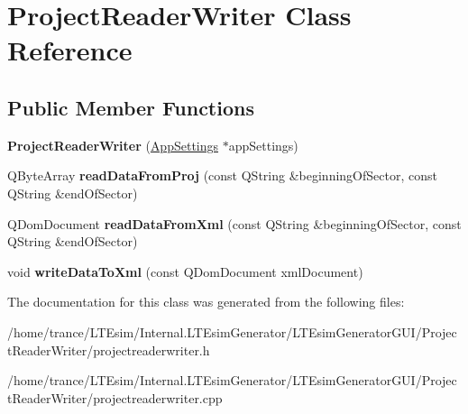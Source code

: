 \hypertarget{class_project_reader_writer}{}\section{Project\+Reader\+Writer Class Reference}
\label{class_project_reader_writer}
\subsection*{Public Member Functions}
\begin{DoxyCompactItemize}
\item 
{\bfseries Project\+Reader\+Writer} (\hyperlink{class_app_settings}{App\+Settings} $\ast$app\+Settings)\hypertarget{class_project_reader_writer_a1d6ed1cbeb33ce0e7b4ebf5c780dbdd0}{}\label{class_project_reader_writer_a1d6ed1cbeb33ce0e7b4ebf5c780dbdd0}

\item 
Q\+Byte\+Array {\bfseries read\+Data\+From\+Proj} (const Q\+String \&beginning\+Of\+Sector, const Q\+String \&end\+Of\+Sector)\hypertarget{class_project_reader_writer_a73636120e388c13d6d90c4c51c8044be}{}\label{class_project_reader_writer_a73636120e388c13d6d90c4c51c8044be}

\item 
Q\+Dom\+Document {\bfseries read\+Data\+From\+Xml} (const Q\+String \&beginning\+Of\+Sector, const Q\+String \&end\+Of\+Sector)\hypertarget{class_project_reader_writer_a5e14c23a3d2dbb36eee88b991e0f5211}{}\label{class_project_reader_writer_a5e14c23a3d2dbb36eee88b991e0f5211}

\item 
void {\bfseries write\+Data\+To\+Xml} (const Q\+Dom\+Document xml\+Document)\hypertarget{class_project_reader_writer_a508a1c86080180fdfde0f8dbe6a77d74}{}\label{class_project_reader_writer_a508a1c86080180fdfde0f8dbe6a77d74}

\end{DoxyCompactItemize}


The documentation for this class was generated from the following files\+:\begin{DoxyCompactItemize}
\item 
/home/trance/\+L\+T\+Esim/\+Internal.\+L\+T\+Esim\+Generator/\+L\+T\+Esim\+Generator\+G\+U\+I/\+Project\+Reader\+Writer/projectreaderwriter.\+h\item 
/home/trance/\+L\+T\+Esim/\+Internal.\+L\+T\+Esim\+Generator/\+L\+T\+Esim\+Generator\+G\+U\+I/\+Project\+Reader\+Writer/projectreaderwriter.\+cpp\end{DoxyCompactItemize}
